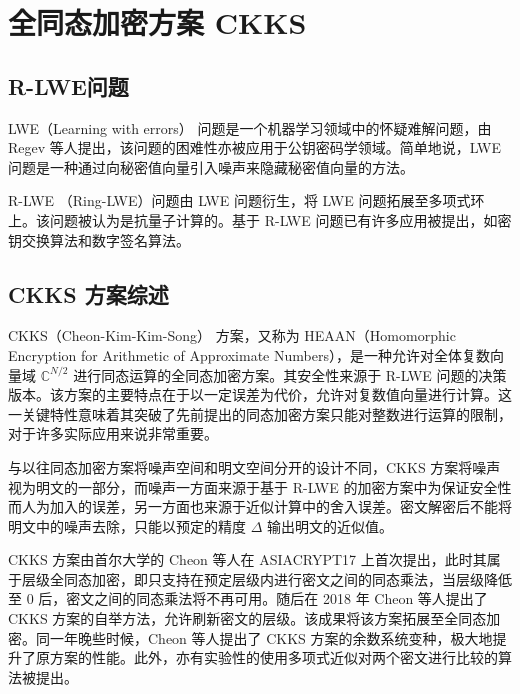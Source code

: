 \section{全同态加密方案 CKKS}

\subsection{R-LWE问题}

LWE（Learning with errors） 问题是一个机器学习领域中的怀疑难解问题，由 Regev 等人提出\cite{10.1145/1568318.1568324}，该问题的困难性亦被应用于公钥密码学领域。简单地说，LWE 问题是一种通过向秘密值向量引入噪声来隐藏秘密值向量的方法。


R-LWE （Ring-LWE）问题由 LWE 问题衍生，将 LWE 问题拓展至多项式环上。该问题被认为是抗量子计算的。基于 R-LWE 问题已有许多应用被提出，如密钥交换算法\cite{cryptoeprint:2012/688}和数字签名算法\cite{cryptoeprint:2011/537}。


\subsection{CKKS 方案综述}

CKKS（Cheon-Kim-Kim-Song） 方案，又称为 HEAAN（Homomorphic Encryption for Arithmetic of Approximate Numbers），是一种允许对全体复数向量域 $\mathbb{C}^{N/2}$ 进行同态运算的全同态加密方案。其安全性来源于 R-LWE 问题的决策版本。该方案的主要特点在于以一定误差为代价，允许对复数值向量进行计算。这一关键特性意味着其突破了先前提出的同态加密方案只能对整数进行运算的限制，对于许多实际应用来说非常重要。

与以往同态加密方案将噪声空间和明文空间分开的设计不同，CKKS 方案将噪声视为明文的一部分，而噪声一方面来源于基于 R-LWE 的加密方案中为保证安全性而人为加入的误差，另一方面也来源于近似计算中的舍入误差。密文解密后不能将明文中的噪声去除，只能以预定的精度 $\Delta$ 输出明文的近似值。\cite{CKKS_optimize}

CKKS 方案由首尔大学的 Cheon 等人在 ASIACRYPT17 上首次提出\cite{cryptoeprint:2016/421}，此时其属于层级全同态加密，即只支持在预定层级内进行密文之间的同态乘法，当层级降低至 0 后，密文之间的同态乘法将不再可用。随后在 2018 年 Cheon 等人提出了 CKKS 方案的自举方法\cite{cryptoeprint:2018/153}，允许刷新密文的层级。该成果将该方案拓展至全同态加密。同一年晚些时候，Cheon 等人提出了 CKKS 方案的余数系统变种，极大地提升了原方案的性能。\cite{cryptoeprint:2018/931}此外，亦有实验性的使用多项式近似对两个密文进行比较的算法被提出\cite{cryptoeprint:2019/417,cryptoeprint:2019/1234,cryptoeprint:2020/834}。

